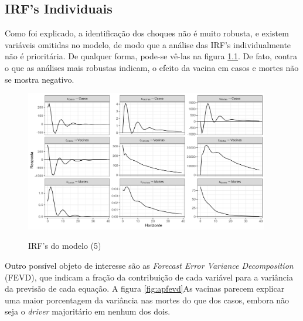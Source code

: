 \documentclass[
    article,
	12pt,				%
	oneside,			%
	a4paper,			%
	english,			%
	brazil,				%
	hyperref = {colorlinks, citecolor=c1d, linkcolor=c2d, urlcolor=c3d, colorlinks}
	]{abntex2}
\newcounter{j}
\begin{document}
\postextual

\newpage
\printbibliography

\newpage
\begin{apendicesenv}

\chapter{IRF's Individuais}\label{ap:single}

Como foi explicado, a identificação dos choques não é muito robusta, e existem variáveis omitidas no modelo, de modo que a análise das IRF's individualmente não é prioritária. De qualquer forma, pode-se vê-las na figura \ref{fig:apirf}. De fato, contra o que as análises mais robustas indicam, o efeito da vacina em casos e mortes não se mostra negativo.

\begin{figure}[H]
    \centering
    \caption{IRF's do modelo (5)}
    \includegraphics[width = 0.95\textwidth]{Figuras/ap_irfs.png}
    \label{fig:apirf}
 \end{figure}

 Outro possível objeto de interesse são as \textit{Forecast Error Variance Decomposition} (FEVD), que indicam a fração da contribuição de cada variável para a variância da previsão de cada equação. A figura \ref{fig:apfevd}As vacinas parecem explicar uma maior porcentagem da variância nas mortes do que dos casos, embora não seja o \textit{driver} majoritário em nenhum dos dois.


\end{apendicesenv}
\end{document}
